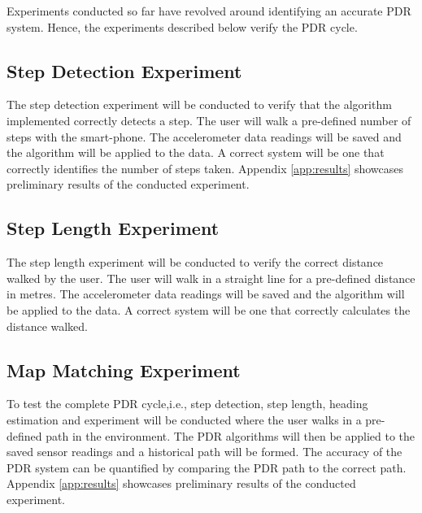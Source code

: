           Experiments conducted so far have revolved around identifying an accurate PDR system. Hence, the experiments described below verify the PDR cycle.
        
          \subsection{Step Detection Experiment}
          The step detection experiment will be conducted to verify that the algorithm implemented correctly detects a step. The user will walk a pre-defined number of steps with the smart-phone. The accelerometer data readings will be saved and the algorithm will be applied to the data. A correct system will be one that correctly identifies the number of steps taken. Appendix \ref{app:results} showcases preliminary results of the conducted experiment.

          \subsection{Step Length Experiment}
          
          The step length experiment will be conducted to verify the correct distance walked by the user. The user will walk in a straight line for a pre-defined distance in metres. The accelerometer data readings will be saved and the algorithm will be applied to the data. A correct system will be one that correctly calculates the distance walked.

          \subsection{Map Matching Experiment}
          To test the complete PDR cycle,i.e., step detection, step length, heading estimation and experiment will be conducted where the user walks in a pre-defined path in the environment. The PDR algorithms will then be applied to the saved sensor readings and a historical path will be formed. The accuracy of the PDR system can be quantified by comparing the PDR path to the correct path. Appendix \ref{app:results} showcases preliminary results of the conducted experiment.